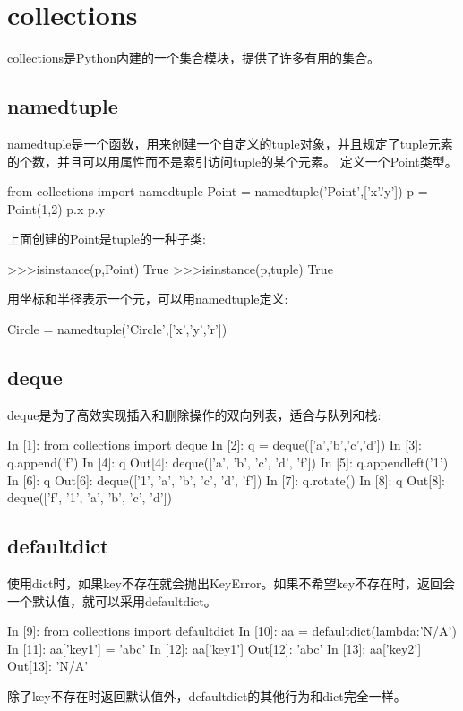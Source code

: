 \section{collections}
collections是Python内建的一个集合模块，提供了许多有用的集合。
\subsection{namedtuple}
namedtuple是一个函数，用来创建一个自定义的tuple对象，并且规定了tuple元素的个数，并且可以用属性而不是索引访问tuple的某个元素。
定义一个Point类型。
\begin{python}
from collections import namedtuple
Point = namedtuple('Point',['x'.'y'])
p = Point(1,2)
p.x
p.y
\end{python}
上面创建的Point是tuple的一种子类:
\begin{python}
	>>>isinstance(p,Point)
	True
	>>>isinstance(p,tuple)
	True
\end{python}
用坐标和半径表示一个元，可以用namedtuple定义:
\begin{python}
	Circle = namedtuple('Circle',['x','y','r'])
\end{python}
\subsection{deque}
deque是为了高效实现插入和删除操作的双向列表，适合与队列和栈:
\begin{python}
In [1]: from collections import deque
In [2]: q = deque(['a','b','c','d'])
In [3]: q.append('f')
In [4]: q
Out[4]: deque(['a', 'b', 'c', 'd', 'f'])
In [5]: q.appendleft('1')
In [6]: q
Out[6]: deque(['1', 'a', 'b', 'c', 'd', 'f'])
In [7]: q.rotate()
In [8]: q
Out[8]: deque(['f', '1', 'a', 'b', 'c', 'd'])
\end{python}
\subsection{defaultdict}
使用dict时，如果key不存在就会抛出KeyError。如果不希望key不存在时，返回会一个默认值，就可以采用defaultdict。
\begin{python}
In [9]: from collections import defaultdict
In [10]: aa = defaultdict(lambda:'N/A')
In [11]: aa['key1'] = 'abc'
In [12]: aa['key1']
Out[12]: 'abc'
In [13]: aa['key2']
Out[13]: 'N/A'
\end{python}
除了key不存在时返回默认值外，defaultdict的其他行为和dict完全一样。
